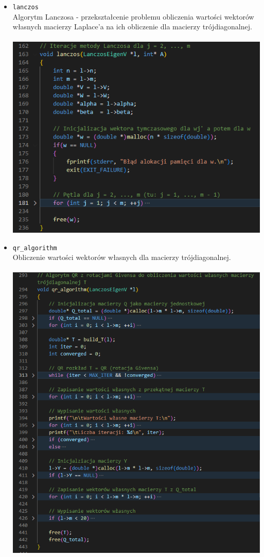 \documentclass{article}
\begin{document}
\begin{itemize}
        \item \texttt{lanczos} \\
        Algorytm Lanczosa - przekształcenie problemu obliczenia wartości wektorów własnych macierzy Laplace'a na ich obliczenie dla macierzy trójdiagonalnej. \\\\
        \includegraphics[width=0.8\linewidth, center]{img/lanczos.png}

        \item \texttt{qr\_algorithm} \\
        Obliczenie wartości wektorów własnych dla macierzy trójdiagonalnej. \\\\
        \includegraphics[width=0.8\linewidth, center]{img/qr_algorithm.png}
        

\end{itemize}
\end{document}

